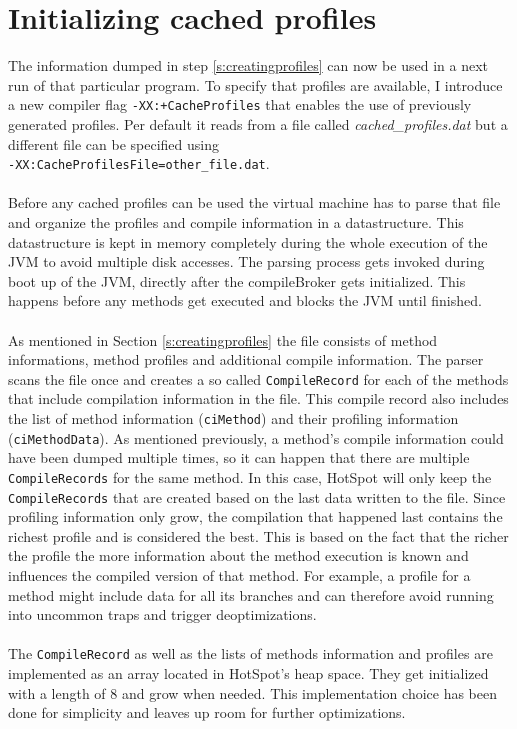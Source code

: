 \section{Initializing cached profiles}
\label{s:initializingprofiles}
The information dumped in step \ref{s:creatingprofiles} can now be used in a next run of that particular program.
To specify that profiles are available, I introduce a new compiler flag \texttt{-XX:+CacheProfiles} that enables the use of previously generated profiles. Per default it reads from a file called \textit{cached\_profiles.dat} but a different file can be specified using \\\texttt{-XX:CacheProfilesFile=other\_file.dat}.
\\\\
Before any cached profiles can be used the virtual machine has to parse that file and organize the profiles and compile information in a datastructure. This datastructure is kept in memory completely during the whole execution of the JVM to avoid multiple disk accesses.
The parsing process gets invoked during boot up of the JVM, directly after the compileBroker gets initialized. This happens before any methods get executed and blocks the JVM until finished.
\\\\
As mentioned in Section \ref{s:creatingprofiles} the file consists of method informations, method profiles and additional compile information. The parser scans the file once and creates a so called \texttt{CompileRecord} for each of the methods that include compilation information in the file. This compile record also includes the list of method information (\texttt{ciMethod}) and their profiling information (\texttt{ciMethodData}).
As mentioned previously, a method's compile information could have been dumped multiple times, so it can happen that there are multiple \texttt{CompileRecords} for the same method. In this case, HotSpot will only keep the \texttt{CompileRecords} that are created based on the last data written to the file.
Since profiling information only grow, the compilation that happened last contains the richest profile and is considered the best.
This is based on the fact that the richer the profile the more information about the method execution is known and influences the compiled version of that method. For example, a profile for a method might include data for all its branches and can therefore avoid running into uncommon traps and trigger deoptimizations.
\\\\
The \texttt{CompileRecord} as well as the lists of methods information and profiles are implemented as an array located in HotSpot's heap space.
They get initialized with a length of 8 and grow when needed. This implementation choice has been done for simplicity and leaves up room for further optimizations.

